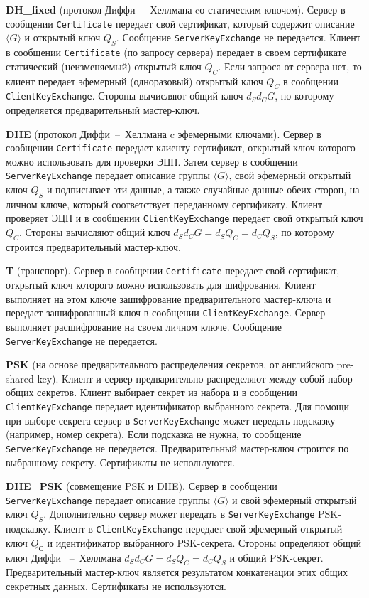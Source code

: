 {\bf DH\_fixed} (протокол Диффи~--~Хеллмана cо статическим ключом). Сервер в 
сообщении \lstinline{Certificate} передает свой сертификат, который содержит 
описание $\langle G \rangle$ и открытый ключ $Q_{S}$. Сообщение 
\lstinline{ServerKeyExchange} не передается. Клиент в сообщении 
\lstinline{Certificate} (по запросу сервера) передает в своем сертификате 
статический (неизменяемый) открытый ключ $Q_{C}$. Если запроса от сервера 
нет, то клиент передает эфемерный (одноразовый) открытый ключ $Q_{C}$ в 
сообщении \lstinline{ClientKeyExchange}. Стороны вычисляют общий ключ 
$d_{S}d_{C}G$, по которому определяется предварительный мастер-ключ. 

{\bf DHE} (протокол Диффи~--~Хеллмана c эфемерными ключами). Сервер в 
сообщении \lstinline{Certificate} передает клиенту сертификат, открытый ключ 
которого можно использовать для проверки ЭЦП. Затем сервер в сообщении 
\lstinline{ServerKeyExchange} передает описание группы $\langle G \rangle$, 
свой эфемерный открытый ключ $Q_{S}$ и подписывает эти данные, а также 
случайные данные обеих сторон, на личном ключе, который соответствует 
переданному сертификату. Клиент проверяет ЭЦП и в сообщении 
\lstinline{ClientKeyExchange} передает свой открытый ключ $Q_{C}$. Стороны 
вычисляют общий ключ $d_{S}d_{C}G = d_{S}Q_{C} = d_{C}Q_{S}$, по которому 
строится предварительный мастер-ключ.  

{\bf T} (транспорт). Сервер в сообщении \lstinline{Certificate} передает свой 
сертификат, открытый ключ которого можно использовать для шифрования. 
Клиент выполняет на этом ключе зашифрование предварительного мастер-ключа 
и передает зашифрованный ключ в сообщении \lstinline{ClientKeyExchange}. 
Сервер выполняет расшифрование на своем личном ключе. Сообщение 
\lstinline{ServerKeyExchange} не передается. 

{\bf PSK} (на основе предварительного распределения секретов, от 
английского pre-shared key). Клиент и сервер предварительно распределяют 
между собой набор общих секретов. Клиент выбирает секрет из набора и в 
сообщении \lstinline{ClientKeyExchange} передает идентификатор выбранного 
секрета. Для помощи при выборе секрета сервер в 
\lstinline{ServerKeyExchange} может передать подсказку (например, номер 
секрета). Если подсказка не нужна, то сообщение 
\lstinline{ServerKeyExchange} не передается. Предварительный мастер-ключ 
строится по выбранному секрету. Сертификаты не используются.  

{\bf DHE\_PSK} (совмещение PSK и DHE). Сервер в сообщении 
\lstinline{ServerKeyExchange} передает описание группы $\langle G \rangle$ и 
свой эфемерный открытый ключ $Q_{S}$. Дополнительно сервер может передать 
в \lstinline{ServerKeyExchange} PSK-подсказку. Клиент в 
\lstinline{ClientKeyExchange} передает свой эфемерный открытый ключ $Q_{С}$ и 
идентификатор выбранного PSK-секрета. Стороны определяют общий ключ Диффи 
~--~Хеллмана $d_{S}d_{C}G = d_{S}Q_{C} = d_{C}Q_{S}$ и общий PSK-секрет. 
Предварительный мастер-ключ является результатом конкатенации этих общих 
секретных данных. Сертификаты не используются. 

